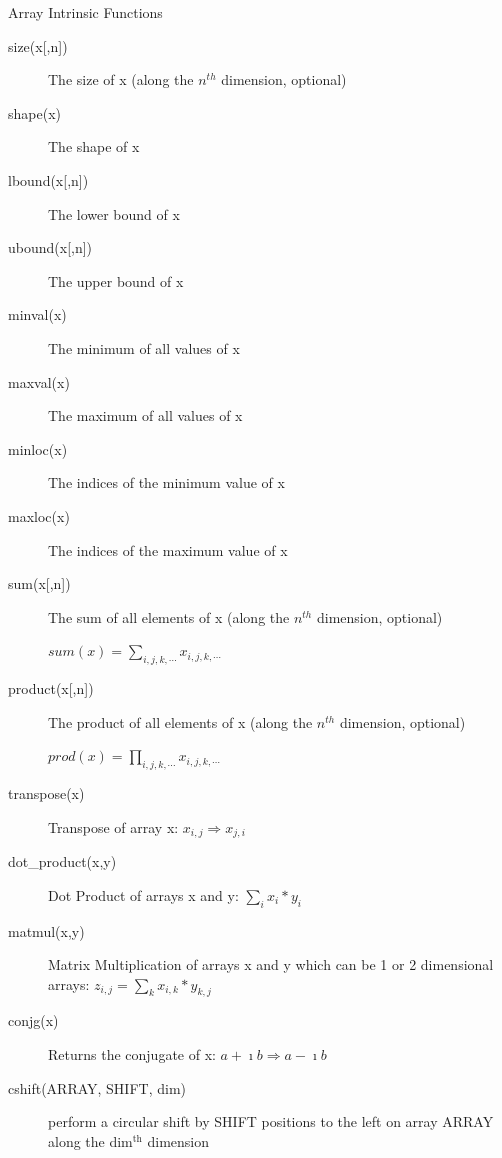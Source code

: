 \documentclass[c,mathserif,compress,xcolor=svgnames]{beamer}
\begin{document}
\begin{frame}[allowframebreaks]{Array Intrinsic Functions}
  \begin{description}
    \item[{size(x[,n])}] The size of x (along the $n^{th}$ dimension, optional)
    \item[shape(x)] The shape of x
    \item[{lbound(x[,n])}] The lower bound of x
    \item[{ubound(x[,n])}] The upper bound of x
    \item[minval(x)] The minimum of all values of x
    \item[maxval(x)] The maximum of all values of x
    \item[minloc(x)] The indices of the minimum value of x
    \item[maxloc(x)] The indices of the maximum value of x
    \item[{sum(x[,n])}] The sum of all elements of x (along the $n^{th}$ dimension, optional)
    \item[] $sum(x) = \sum_{i,j,k,\cdots}x_{i,j,k,\cdots}$
      \framebreak
    \item[{product(x[,n])}] The product of all elements of x (along the $n^{th}$ dimension, optional)
    \item[] $prod(x) = \prod_{i,j,k,\cdots}x_{i,j,k,\cdots}$
    \item[transpose(x)] Transpose of array x: $ x_{i,j}\Rightarrow x_{j,i}$
    \item[dot\_product(x,y)] Dot Product of arrays x and y: $ \sum_{i} x_i* y_i $
    \item[matmul(x,y)] Matrix Multiplication of arrays x and y which can be 1 or 2 dimensional arrays: $ z_{i,j} = \sum_k x_{i,k} * y_{k,j}$
    \item[conjg(x)] Returns the conjugate of x: $ a + \imath b \Rightarrow a - \imath b$
    \item[cshift(ARRAY, SHIFT, dim)] perform a circular shift by SHIFT positions to the left on array ARRAY along the dim$^{\mathrm{th}}$ dimension
  \end{description}
\end{frame}
\end{document}
